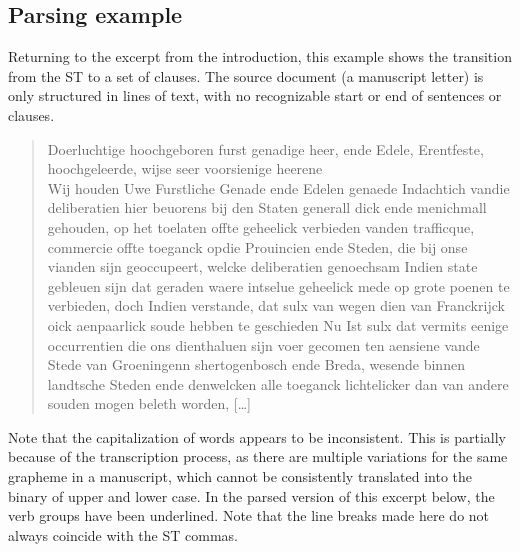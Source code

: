 \begin{paper}
\subsection{Parsing example}

Returning to the excerpt from the introduction, this example shows the
transition from the ST to a set of clauses. The source document (a
manuscript letter) is only structured in lines of text, with no
recognizable start or end of sentences or clauses.

\begin{quote}
Doerluchtige hoochgeboren furst genadige heer, ende Edele, Erentfeste,
hoochgeleerde, wijse seer voorsienige heerene\\
Wij houden Uwe Furstliche Genade ende Edelen genaede Indachtich vandie
deliberatien hier beuorens bij den Staten generall dick ende menichmall
gehouden, op het toelaten offte geheelick verbieden vanden trafficque,
commercie offte toeganck opdie Prouincien ende Steden, die bij onse
vianden sijn geoccupeert, welcke deliberatien genoechsam Indien state
gebleuen sijn dat geraden waere intselue geheelick mede op grote poenen
te verbieden, doch Indien verstande, dat sulx van wegen dien van
Franckrijck oick aenpaarlick soude hebben te geschieden Nu Ist sulx dat
vermits eenige occurrentien die ons dienthaluen sijn voer gecomen ten
aensiene vande Stede van Groeningenn shertogenbosch ende Breda, wesende
binnen landtsche Steden ende denwelcken alle toeganck lichtelicker dan
van andere souden mogen beleth worden, {[}\ldots{}{]}
\begin{flushright}
\end{flushright}
\end{quote}

\noindent Note that the capitalization of words appears to be inconsistent. This
is partially because of the transcription process, as there are multiple
variations for the same grapheme in a manuscript, which cannot be
consistently translated into the binary of upper and lower case. In the
parsed version of this excerpt below, the verb groups have been
underlined. Note that the line breaks made here do not always coincide
with the ST commas.


\end{paper}
